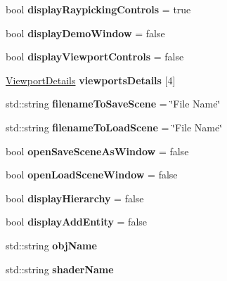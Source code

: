 \begin{DoxyCompactItemize}
\mbox{\label{classpiolot_1_1_test_scene_aeff84b8ca87f60068340a8a3afbe11e5}} 
bool {\bfseries display\+Raypicking\+Controls} = true
\item 
\mbox{\label{classpiolot_1_1_test_scene_a7416b0c39baa5a3154ac88bda22bdf25}} 
bool {\bfseries display\+Demo\+Window} = false
\item 
\mbox{\label{classpiolot_1_1_test_scene_a5f2a7d4a162916445d89f338c01dbc93}} 
bool {\bfseries display\+Viewport\+Controls} = false
\item 
\mbox{\label{classpiolot_1_1_test_scene_a0cbccb0354c0c68f277c2360cefc9ab7}} 
\mbox{\hyperlink{structpiolot_1_1_viewport_details}{Viewport\+Details}} {\bfseries viewports\+Details} \mbox{[}4\mbox{]}
\item 
\mbox{\label{classpiolot_1_1_test_scene_a9f8ea97b9444b79a962ec590af5761d3}} 
std\+::string {\bfseries filename\+To\+Save\+Scene} = \char`\"{}File Name\char`\"{}
\item 
\mbox{\label{classpiolot_1_1_test_scene_a6dfdaeb3f1711bcca9b85bc5a0a5acd3}} 
std\+::string {\bfseries filename\+To\+Load\+Scene} = \char`\"{}File Name\char`\"{}
\item 
\mbox{\label{classpiolot_1_1_test_scene_a6a9853bb71c428b0842dce2af2976514}} 
bool {\bfseries open\+Save\+Scene\+As\+Window} = false
\item 
\mbox{\label{classpiolot_1_1_test_scene_a29392a8bc16ade36f204bf56fa68cb17}} 
bool {\bfseries open\+Load\+Scene\+Window} = false
\item 
\mbox{\label{classpiolot_1_1_test_scene_ab906d0870595d299b454becf24219171}} 
bool {\bfseries display\+Hierarchy} = false
\item 
\mbox{\label{classpiolot_1_1_test_scene_a4123335b4ec13948ff01ae9f344d9546}} 
bool {\bfseries display\+Add\+Entity} = false
\item 
\mbox{\label{classpiolot_1_1_test_scene_ad18ff08a06cd2076ea3b76c4d08867cc}} 
std\+::string {\bfseries obj\+Name}
\item 
\mbox{\label{classpiolot_1_1_test_scene_ae88852d0c8e77c07196e67cc1e93759c}} 
std\+::string {\bfseries shader\+Name}
\end{DoxyCompactItemize}
